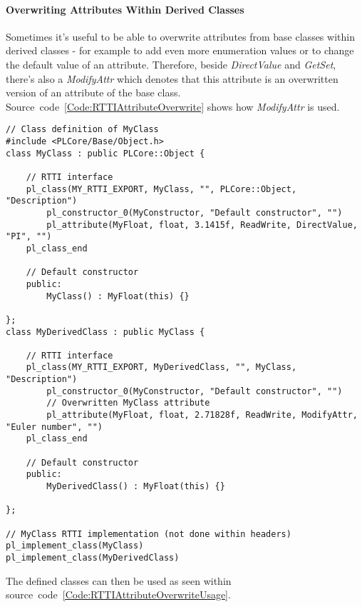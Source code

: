 \paragraph{Overwriting Attributes Within Derived Classes}
Sometimes it's useful to be able to overwrite attributes from base classes within derived classes - for example to add even more enumeration values or to change the default value of an attribute. Therefore, beside \emph{DirectValue} and \emph{GetSet}, there's also a \emph{ModifyAttr} which denotes that this attribute is an overwritten version of an attribute of the base class. Source~code~\ref{Code:RTTIAttributeOverwrite} shows how \emph{ModifyAttr} is used.
\begin{lstlisting}[label=Code:RTTIAttributeOverwrite,caption={Overwriting RTTI attributes in derived classes}]
// Class definition of MyClass
#include <PLCore/Base/Object.h>
class MyClass : public PLCore::Object {

	// RTTI interface
	pl_class(MY_RTTI_EXPORT, MyClass, "", PLCore::Object, "Description")
		pl_constructor_0(MyConstructor, "Default constructor", "")
		pl_attribute(MyFloat, float, 3.1415f, ReadWrite, DirectValue, "PI", "")
	pl_class_end

	// Default constructor
	public:
		MyClass() : MyFloat(this) {}

};
class MyDerivedClass : public MyClass {

	// RTTI interface
	pl_class(MY_RTTI_EXPORT, MyDerivedClass, "", MyClass, "Description")
		pl_constructor_0(MyConstructor, "Default constructor", "")
		// Overwritten MyClass attribute
		pl_attribute(MyFloat, float, 2.71828f, ReadWrite, ModifyAttr, "Euler number", "")
	pl_class_end

	// Default constructor
	public:
		MyDerivedClass() : MyFloat(this) {}

};

// MyClass RTTI implementation (not done within headers)
pl_implement_class(MyClass)
pl_implement_class(MyDerivedClass)
\end{lstlisting}
The defined classes can then be used as seen within source~code~\ref{Code:RTTIAttributeOverwriteUsage}.

